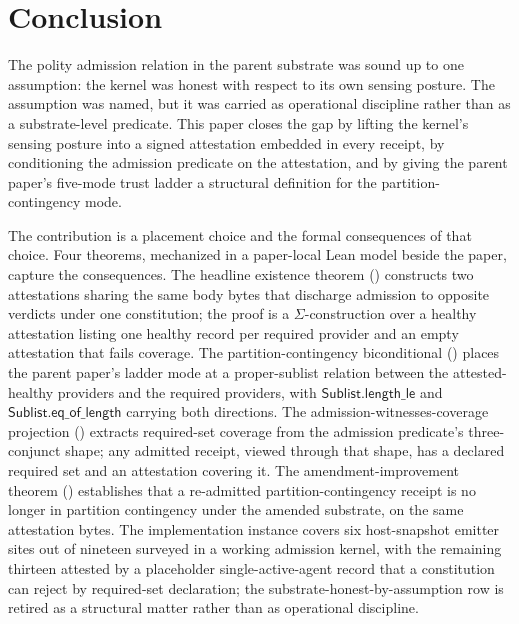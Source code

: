 \section{Conclusion}
\label{sec:conclusion}

The polity admission relation in the parent substrate was sound up to one assumption: the kernel was honest with respect to its own sensing posture. The assumption was named, but it was carried as operational discipline rather than as a substrate-level predicate. This paper closes the gap by lifting the kernel's sensing posture into a signed attestation embedded in every receipt, by conditioning the admission predicate on the attestation, and by giving the parent paper's five-mode trust ladder a structural definition for the partition-contingency mode.

The contribution is a placement choice and the formal consequences of that choice. Four theorems, mechanized in a paper-local Lean model beside the paper, capture the consequences. The headline existence theorem () constructs two attestations sharing the same body bytes that discharge admission to opposite verdicts under one constitution; the proof is a $\Sigma$-construction over a healthy attestation listing one healthy record per required provider and an empty attestation that fails coverage. The partition-contingency biconditional () places the parent paper's ladder mode at a proper-sublist relation between the attested-healthy providers and the required providers, with $\mathsf{Sublist.length\_le}$ and $\mathsf{Sublist.eq\_of\_length}$ carrying both directions. The admission-witnesses-coverage projection () extracts required-set coverage from the admission predicate's three-conjunct shape; any admitted receipt, viewed through that shape, has a declared required set and an attestation covering it. The amendment-improvement theorem () establishes that a re-admitted partition-contingency receipt is no longer in partition contingency under the amended substrate, on the same attestation bytes. The implementation instance covers six host-snapshot emitter sites out of nineteen surveyed in a working admission kernel, with the remaining thirteen attested by a placeholder single-active-agent record that a constitution can reject by required-set declaration; the substrate-honest-by-assumption row is retired as a structural matter rather than as operational discipline.


